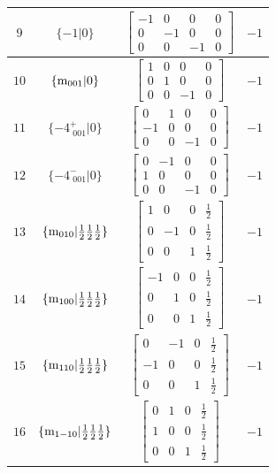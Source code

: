 \documentclass[fleqn,8pt]{jsarticle}
\begin{document}
\begin{longtable}{cccc}
$ 9 $ & $ \{-1|0\} $ & $ \begin{bmatrix} -1 & 0 & 0 & 0 \\ 0 & -1 & 0 & 0 \\ 0 & 0 & -1 & 0 \end{bmatrix} $ & $ -1 $ \\ \hline
$ 10 $ & $ \{{\rm m}_{001}|0\} $ & $ \begin{bmatrix} 1 & 0 & 0 & 0 \\ 0 & 1 & 0 & 0 \\ 0 & 0 & -1 & 0 \end{bmatrix} $ & $ -1 $ \\ \hline
$ 11 $ & $ \{-4^{+}_{\,\,001}|0\} $ & $ \begin{bmatrix} 0 & 1 & 0 & 0 \\ -1 & 0 & 0 & 0 \\ 0 & 0 & -1 & 0 \end{bmatrix} $ & $ -1 $ \\ \hline
$ 12 $ & $ \{-4^{-}_{\,\,001}|0\} $ & $ \begin{bmatrix} 0 & -1 & 0 & 0 \\ 1 & 0 & 0 & 0 \\ 0 & 0 & -1 & 0 \end{bmatrix} $ & $ -1 $ \\ \hline
$ 13 $ & $ \{{\rm m}_{010}|\frac{1}{2} \frac{1}{2} \frac{1}{2}\} $ & $ \begin{bmatrix} 1 & 0 & 0 & \frac{1}{2} \\ 0 & -1 & 0 & \frac{1}{2} \\ 0 & 0 & 1 & \frac{1}{2} \end{bmatrix} $ & $ -1 $ \\ \hline
$ 14 $ & $ \{{\rm m}_{100}|\frac{1}{2} \frac{1}{2} \frac{1}{2}\} $ & $ \begin{bmatrix} -1 & 0 & 0 & \frac{1}{2} \\ 0 & 1 & 0 & \frac{1}{2} \\ 0 & 0 & 1 & \frac{1}{2} \end{bmatrix} $ & $ -1 $ \\ \hline
$ 15 $ & $ \{{\rm m}_{110}|\frac{1}{2} \frac{1}{2} \frac{1}{2}\} $ & $ \begin{bmatrix} 0 & -1 & 0 & \frac{1}{2} \\ -1 & 0 & 0 & \frac{1}{2} \\ 0 & 0 & 1 & \frac{1}{2} \end{bmatrix} $ & $ -1 $ \\ \hline
$ 16 $ & $ \{{\rm m}_{1-10}|\frac{1}{2} \frac{1}{2} \frac{1}{2}\} $ & $ \begin{bmatrix} 0 & 1 & 0 & \frac{1}{2} \\ 1 & 0 & 0 & \frac{1}{2} \\ 0 & 0 & 1 & \frac{1}{2} \end{bmatrix} $ & $ -1 $ \\
\end{longtable}
\end{document}
